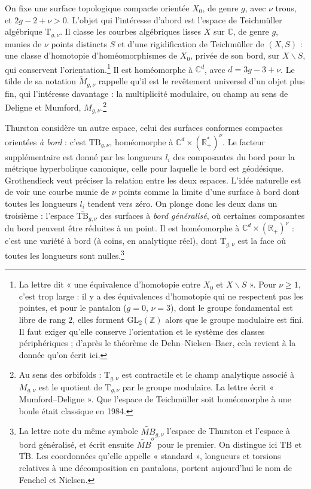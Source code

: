 \documentclass[11pt,a4paper]{article}
\begin{document}
On fixe une surface topologique compacte orientée $X_0$, de genre $g$, avec
$\nu$ trous, et $2g - 2 + \nu > 0$. L'objet qui l'intéresse d'abord est
l'espace de Teichmüller algébrique $\mathrm{T}_{g,\nu}$. Il classe les
courbes algébriques lisses $X$ sur $\mathbb{C}$, de genre $g$, munies de
$\nu$ points distincts $S$ et d'une rigidification de Teichmüller de
$(X,S)$ : une classe d'homotopie d'homéomorphismes de $X_0$, privée de son
bord, sur $X \smallsetminus S$, qui conservent l'orientation.\footnote{La
lettre dit « une équivalence d'homotopie entre $X_0$ et
$X \smallsetminus S$ ». Pour $\nu \geqslant 1$, c'est trop large : il y a des
équivalences d'homotopie qui ne respectent pas les pointes, et pour le
pantalon ($g = 0$, $\nu = 3$), dont le groupe fondamental est libre de rang
$2$, elles forment $\mathrm{GL}_2(\mathbb{Z})$ alors que le groupe modulaire
est fini. Il faut exiger qu'elle conserve l'orientation et le système des
classes périphériques ; d'après le théorème de Dehn--Nielsen--Baer, cela
revient à la donnée qu'on écrit ici.} Il est homéomorphe à $\mathbb{C}^{d}$,
avec $d = 3g - 3 + \nu$. Le tilde de sa notation
$\widetilde{M}_{g,\nu}$ rappelle qu'il est le revêtement universel d'un objet
plus fin, qui l'intéresse davantage : la multiplicité modulaire, ou champ au
sens de Deligne et Mumford, $M_{g,\nu}$.\footnote{Au sens des orbifolds :
$\mathrm{T}_{g,\nu}$ est contractile et le champ analytique associé à
$M_{g,\nu}$ est le quotient de $\mathrm{T}_{g,\nu}$ par le groupe modulaire.
La lettre écrit « Mumford--Deligne ». Que l'espace de Teichmüller soit
homéomorphe à une boule était classique en 1984.}

Thurston considère un autre espace, celui des surfaces conformes compactes
orientées \emph{à bord} : c'est $\mathrm{TB}_{g,\nu}$, homéomorphe à
$\mathbb{C}^{d} \times (\mathbb{R}^{*}_{+})^{\nu}$. Le facteur
supplémentaire est donné par les longueurs $l_i$ des composantes du bord pour
la métrique hyperbolique canonique, celle pour laquelle le bord est
géodésique. Grothendieck veut préciser la relation entre les deux espaces.
L'idée naturelle est de voir une courbe munie de $\nu$ points comme la limite
d'une surface à bord dont toutes les longueurs $l_i$ tendent vers zéro. On
plonge donc les deux dans un troisième : l'espace
$\overline{\mathrm{TB}}_{g,\nu}$ des surfaces à \emph{bord généralisé}, où
certaines composantes du bord peuvent être réduites à un point. Il est
homéomorphe à $\mathbb{C}^{d} \times (\mathbb{R}_{+})^{\nu}$ : c'est une
variété à bord (à coins, en analytique réel), dont $\mathrm{T}_{g,\nu}$ est la
face où toutes les longueurs sont nulles.\footnote{La lettre note du même
symbole $\widetilde{MB}_{g,\nu}$ l'espace de Thurston et l'espace à bord
généralisé, et écrit ensuite $\widetilde{MB}^{o}$ pour le premier. On
distingue ici $\mathrm{TB}$ et $\overline{\mathrm{TB}}$. Les coordonnées
qu'elle appelle « standard », longueurs et torsions relatives à une
décomposition en pantalons, portent aujourd'hui le nom de Fenchel et
Nielsen.}
\end{document}
